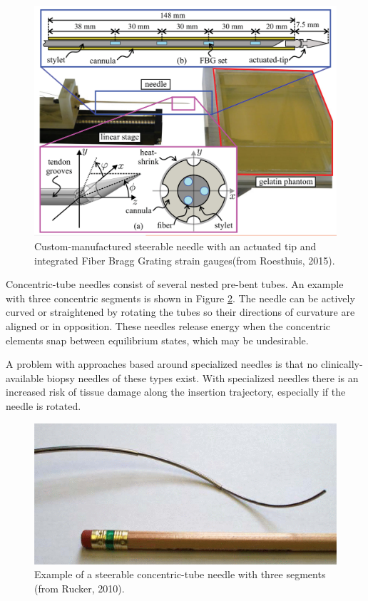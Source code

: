 \begin{figure}[h]
\includegraphics[width=1.0\textwidth]{Fig/chap2/actuated_tip_needle.png}
\caption{Custom-manufactured steerable needle with an actuated tip and integrated Fiber Bragg Grating strain gauges(from Roesthuis, 2015).}
\label{fig:actuated_tip}
\end{figure}

Concentric-tube needles consist of several nested pre-bent tubes\cite{webster_mechanics_2009, rucker_geometrically_2010, dupont_design_2010-1}. An example with three concentric segments is shown in Figure \ref{fig:concentric_tubes}. The needle can be actively curved or straightened by rotating the tubes so their directions of curvature are aligned or in opposition. These needles release energy when the concentric elements snap between equilibrium states, which may be undesirable.

A problem with approaches based around specialized needles is that no clinically-available biopsy needles of these types exist. With specialized needles there is an increased risk of tissue damage along the insertion trajectory, especially if the needle is rotated.

\begin{figure}[h]
\includegraphics[width=1.0\textwidth]{Fig/chap2/concentric_needle.png}
\caption{Example of a steerable concentric-tube needle with three segments (from Rucker, 2010).}
\label{fig:concentric_tubes}
\end{figure}

